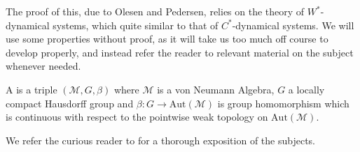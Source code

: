 \begin{remark}
	The proof of this, due to Olesen and Pedersen, relies on the theory of $W^*$-dynamical systems, which quite similar to that of $C^*$-dynamical systems. We will use some properties without proof, as it will take us too much off course to develop properly, and instead refer the reader to relevant material on the subject whenever needed.	
\begin{definition}
	A  is a triple $(\mathscr{M},G,\beta)$ where $\mathscr{M}$ is a von Neumann Algebra, $G$ a locally compact Hausdorff group and $\beta \colon G \to \mathrm{Aut}(\mathscr{M})$ is group homomorphism which is continuous with respect to the pointwise weak topology on $\mathrm{Aut}(\mathscr{M})$.
\end{definition}
	 We refer the curious reader to \cite[Chapter 7.4 and 7.10]{pedersenalgauto} for a thorough exposition of the subjects.
\end{remark}
